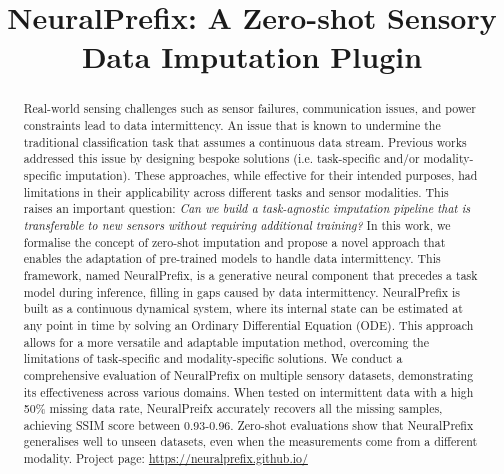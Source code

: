 \documentclass[10pt, conference, compsocconf]{IEEEtran}
\begin{document}
\title{NeuralPrefix: A Zero-shot Sensory Data Imputation Plugin}

\author{
\and
{}
}

\maketitle

\begin{abstract}
Real-world sensing challenges such as sensor failures, communication issues, and power constraints lead to data intermittency. An issue that is known to undermine the traditional classification task that assumes a continuous data stream. Previous works addressed this issue by designing bespoke solutions (i.e. task-specific and/or modality-specific imputation). These approaches, while effective for their intended purposes, had limitations in their applicability across different tasks and sensor modalities. This raises an important question: \textit{Can we build a task-agnostic imputation pipeline that is transferable to new sensors without requiring additional training?} In this work, we formalise the concept of zero-shot imputation and propose a novel approach that enables the adaptation of pre-trained models to handle data intermittency. This framework, named NeuralPrefix, is a generative neural component that precedes a task model during inference, filling in gaps caused by data intermittency. NeuralPrefix is built as a continuous dynamical system, where its internal state can be estimated at any point in time by solving an Ordinary Differential Equation (ODE). This approach allows for a more versatile and adaptable imputation method, overcoming the limitations of task-specific and modality-specific solutions. We conduct a comprehensive evaluation of NeuralPrefix on multiple sensory datasets, demonstrating its effectiveness across various domains. When tested on intermittent data with a high 50\% missing data rate, NeuralPreifx accurately recovers all the missing samples, achieving SSIM score between 0.93-0.96.  Zero-shot evaluations show that NeuralPrefix generalises well to unseen datasets, even when the measurements come from a different modality. Project page: \href{https://neuralprefix.github.io/}{https://neuralprefix.github.io/}

\end{abstract}
\end{document}
